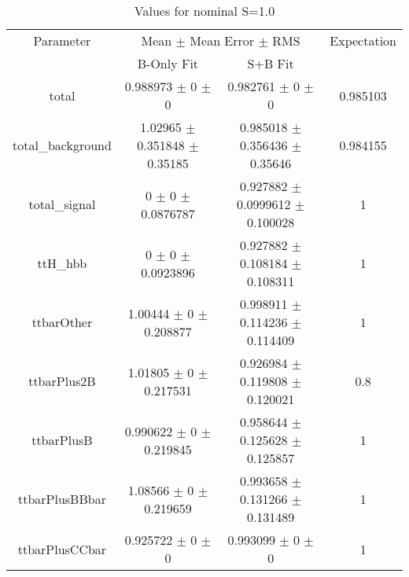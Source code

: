 \begin{table}
\centering
\caption{Values for nominal S=1.0}
\begin{tabular}{cccc}
\toprule
Parameter & \multicolumn{2}{c}{Mean $\pm$ Mean Error $\pm$ RMS} & Expectation\\
 & B-Only Fit & S+B Fit & \\
\midrule
total & \num{0.988973} $\pm$ \num{0} $\pm$ \num{0} & \num{0.982761} $\pm$ \num{0} $\pm$ \num{0} & \num{0.985103}\\
total\_background & \num{1.02965} $\pm$ \num{0.351848} $\pm$ \num{0.35185} & \num{0.985018} $\pm$ \num{0.356436} $\pm$ \num{0.35646} & \num{0.984155}\\
total\_signal & \num{0} $\pm$ \num{0} $\pm$ \num{0.0876787} & \num{0.927882} $\pm$ \num{0.0999612} $\pm$ \num{0.100028} & \num{1}\\
ttH\_hbb & \num{0} $\pm$ \num{0} $\pm$ \num{0.0923896} & \num{0.927882} $\pm$ \num{0.108184} $\pm$ \num{0.108311} & \num{1}\\
ttbarOther & \num{1.00444} $\pm$ \num{0} $\pm$ \num{0.208877} & \num{0.998911} $\pm$ \num{0.114236} $\pm$ \num{0.114409} & \num{1}\\
ttbarPlus2B & \num{1.01805} $\pm$ \num{0} $\pm$ \num{0.217531} & \num{0.926984} $\pm$ \num{0.119808} $\pm$ \num{0.120021} & \num{0.8}\\
ttbarPlusB & \num{0.990622} $\pm$ \num{0} $\pm$ \num{0.219845} & \num{0.958644} $\pm$ \num{0.125628} $\pm$ \num{0.125857} & \num{1}\\
ttbarPlusBBbar & \num{1.08566} $\pm$ \num{0} $\pm$ \num{0.219659} & \num{0.993658} $\pm$ \num{0.131266} $\pm$ \num{0.131489} & \num{1}\\
ttbarPlusCCbar & \num{0.925722} $\pm$ \num{0} $\pm$ \num{0} & \num{0.993099} $\pm$ \num{0} $\pm$ \num{0} & \num{1}\\
\bottomrule
\end{tabular}
\end{table}